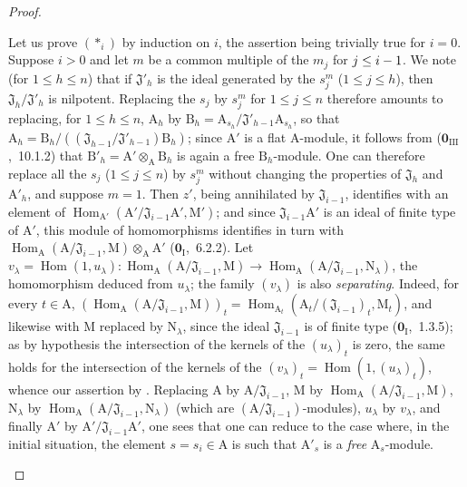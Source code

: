 \begin{proof}
\begin{enumerate}[label=(\roman*)]
  Let us prove $(*_i)$ by induction on $i$, the assertion being trivially true for $i=0$.
  Suppose $i>0$ and let $m$ be a common multiple of the $m_j$ for $j\leq i- 1$.
  We note (for $1\leq h\leq n$) that if $\mathfrak{J}'_h$ is the ideal generated by the $s_j^m$ ($1\leq j\leq h$), then $\mathfrak{J}_h/\mathfrak{J}'_h$ is nilpotent.
  Replacing the $s_j$ by $s_j^m$ for $1\leq j\leq n$ therefore amounts to replacing, for $1\leq h\leq n$, $\mathrm{A}_h$ by
  $\mathrm{B}_h=\mathrm{A}_{s_h}/\mathfrak{J}'_{h-1}\mathrm{A}_{s_h}$, so that
  $\mathrm{A}_h=\mathrm{B}_h/((\mathfrak{J}_{h-1}/\mathfrak{J}'_{h-1})\mathrm{B}_h)$; since $\mathrm{A}'$ is a flat $\mathrm{A}$-module, it follows from ($\mathbf{0}_{\mathrm{III}}$,~10.1.2) that $\mathrm{B}'_h=\mathrm{A}'\otimes_\mathrm{A}\mathrm{B}_h$ is again a free $\mathrm{B}_h$-module.
  One can therefore
  replace all the $s_j$ ($1\leq j\leq n$) by $s_j^m$ without changing the properties of $\mathfrak{J}_h$ and $\mathrm{A}'_h$, and suppose $m=1$.
  Then $z'$, being annihilated by $\mathfrak{J}_{i-1}$, identifies with an element of $\operatorname{Hom}_{\mathrm{A}'}(\mathrm{A}'/\mathfrak{J}_{i-1}\mathrm{A}',\mathrm{M}')$; and since $\mathfrak{J}_{i-1}\mathrm{A}'$ is an ideal of finite type of $\mathrm{A}'$, this module of homomorphisms identifies in turn with $\operatorname{Hom}_\mathrm{A}(\mathrm{A}/\mathfrak{J}_{i-1},\mathrm{M})\otimes_\mathrm{A}\mathrm{A}'$ ($\mathbf{0}_{\mathrm{I}}$,~6.2.2).
  Let $v_\lambda=\operatorname{Hom}(1,u_\lambda):\operatorname{Hom}_\mathrm{A}(\mathrm{A}/\mathfrak{J}_{i-1},\mathrm{M})\to\operatorname{Hom}_\mathrm{A}(\mathrm{A}/\mathfrak{J}_{i-1},\mathrm{N}_\lambda)$, the homomorphism deduced from $u_\lambda$; the family $(v_\lambda)$ is also \emph{separating}.
  Indeed, for every $t\in\mathrm{A}$,
  $(\operatorname{Hom}_\mathrm{A}(\mathrm{A}/\mathfrak{J}_{i-1},\mathrm{M}))_t
  =\operatorname{Hom}_{\mathrm{A}_t}(\mathrm{A}_t/(\mathfrak{J}_{i-1})_t,\mathrm{M}_t)$,
  and likewise with $\mathrm{M}$ replaced by $\mathrm{N}_\lambda$, since the ideal $\mathfrak{J}_{i-1}$ is of finite type ($\mathbf{0}_{\mathrm{I}}$,~1.3.5); as by hypothesis the intersection of the kernels of the $(u_\lambda)_t$ is zero, the same holds for the intersection of the kernels of the $(v_\lambda)_t=\operatorname{Hom}(1,(u_\lambda)_t)$, whence our assertion by .
  Replacing $\mathrm{A}$ by $\mathrm{A}/\mathfrak{J}_{i-1}$, $\mathrm{M}$ by $\operatorname{Hom}_\mathrm{A}(\mathrm{A}/\mathfrak{J}_{i-1},\mathrm{M})$, $\mathrm{N}_\lambda$ by $\operatorname{Hom}_\mathrm{A}(\mathrm{A}/\mathfrak{J}_{i-1},\mathrm{N}_\lambda)$ (which are $(\mathrm{A}/\mathfrak{J}_{i-1})$-modules), $u_\lambda$ by $v_\lambda$, and finally $\mathrm{A}'$ by $\mathrm{A}'/\mathfrak{J}_{i-1}\mathrm{A}'$, one sees that one can reduce to the case where, in the initial situation, the element $s=s_i\in\mathrm{A}$ is such that $\mathrm{A}'_s$ is a \emph{free} $\mathrm{A}_s$-module.

\end{enumerate}
\end{proof}
